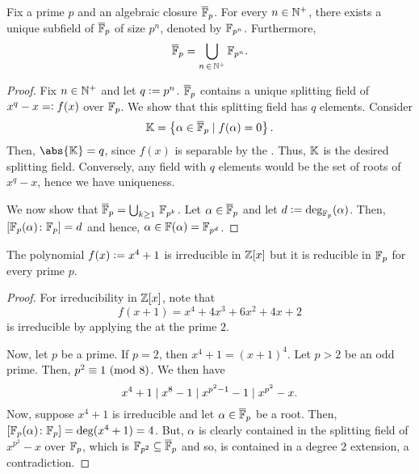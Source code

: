 \begin{theorem} \label{thm:finite-field-existence}
    Fix a prime $p$ and an algebraic closure $\overline{\mathbb{F}}_p$. For every $n \in \mathbb{N}^+$, there exists a unique subfield of $\overline{\mathbb{F}}_p$ of size $p^n$, denoted by $\mathbb{F}_{p^n}$. Furthermore, 
    \[
        \overline{\mathbb{F}}_p = \bigcup_{n \, \in \, \mathbb{N}^+}  \mathbb{F}_{p^n}.
    \]  
\end{theorem}
\begin{proof}
    Fix $n \in \mathbb{N}^+$ and let $q \vcentcolon= p^n$. $\overline{\mathbb{F}}_p$ contains a unique splitting field of $x^q - x =\vcentcolon f(x)$ over $\mathbb{F}_p$. We show that this splitting field has $q$ elements. Consider
    \[
        \mathbb{K} = \left\{ \alpha \in \overline{\mathbb{F}}_p \mid f(\alpha) = 0 \right\}.
    \]
    Then, $\abs{\K} = q$, since $f(x)$ is separable by the . Thus, $\mathbb{K}$ is the desired splitting field. Conversely, any field with $q$ elements would be the set of roots of $x^q - x$, hence we have uniqueness. 
    
    We now show that $\overline{\mathbb{F}}_p = \bigcup_{k\geq 1}\, \mathbb{F}_{p^k}$. Let $\alpha \in \overline{\mathbb{F}}_p$ and let $d \vcentcolon= \deg_{\mathbb{F}_p} (\alpha)$. Then, $[\mathbb{F}_p(\alpha) \colon \mathbb{F}_p] = d$ and hence, $\alpha \in \mathbb{F}(\alpha) = \mathbb{F}_{p^d}$.
\end{proof}

\begin{prop}
    The polynomial $f(x) \vcentcolon= x^4 + 1$ is irreducible in $\mathbb{Z}[x]$ but it is reducible in $\mathbb{F}_p$ for every prime $p$.
\end{prop}
\begin{proof}
    For irreducibility in $\mathbb{Z}[x]$, note that
    \[
        f(x+1) = x^4 + 4x^3 + 6x^2 + 4x + 2
    \]  
    is irreducible by applying the  at the prime $2$.
    
    Now, let $p$ be a prime. If $p = 2$, then $x^4 + 1 = (x+1)^4$. Let $p > 2$ be an odd prime. Then, $p^2 \equiv 1 \ (\mathrm{mod}\ 8)$. We then have
    \[
        x^4 +1 \mid x^8 - 1 \mid x^{p^2-1} - 1 \mid x^{p^2} - x.
    \]
    Now, suppose $x^4 + 1$ is irreducible and let $\alpha \in \overline{\mathbb{F}}_p$ be a root. Then, $[\mathbb{F}_p(\alpha) \colon \mathbb{F}_p] = \deg(x^4 + 1) = 4$. But, $\alpha$ is clearly contained in the splitting field of $x^{p^2} - x$ over $\mathbb{F}_p$, which is $\mathbb{F}_{p^2} \subseteq \overline{\mathbb{F}}_p$ and so, is contained in a degree $2$ extension, a contradiction.
\end{proof}

